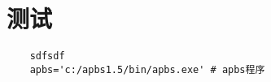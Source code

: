 \section{测试}
\begin{frame}[代码]
    \begin{lstlisting}
    sdfsdf
    apbs='c:/apbs1.5/bin/apbs.exe' # apbs程序
\end{lstlisting}
\end{frame}
